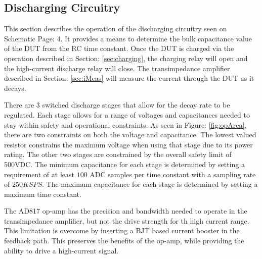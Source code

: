 \subsection{Discharging Circuitry}

This section describes the operation of the discharging circuitry seen on Schematic Page: 4. It provides a means to determine the bulk capacitance value of the DUT from the RC time constant. Once the DUT is charged via the operation described in Section: \ref{sec:charging}, the charging relay will open and the high-current discharge relay will close. The transimpedance amplifier described in Section: \ref{sec:iMeas} will measure the current through the DUT as it decays.

There are 3 switched discharge stages that allow for the decay rate to be regulated. Each stage allows for a range of voltages and capacitances needed to stay within safety and operational constraints. As seen in Figure: \ref{fig:opArea}, there are two constraints on both the voltage and capacitance. The lowest valued resistor constrains the maximum voltage when using that stage due to its power rating. The other two stages are constrained by the overall safety limit of 500VDC. The minimum capacitance for each stage is determined by setting a requirement of at least $100$ ADC samples per time constant with a sampling rate of $250KSPS$. The maximum capacitance for each stage is determined by setting a maximum time constant.



The AD817 op-amp has the precision and bandwidth needed to operate in the transimpedance amplifier, but not the drive strength for th high current range. This limitation is overcome by inserting a BJT based current booster in the feedback path. This preserves the benefits of the op-amp, while providing the ability to drive a high-current signal.

